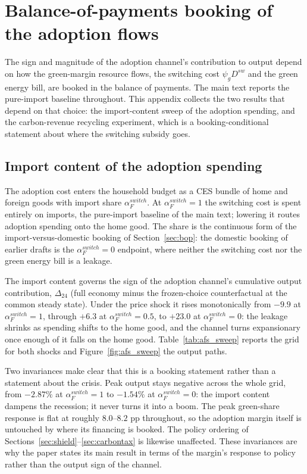 \section{Balance-of-payments booking of the adoption flows}
\label{app:booking}

The sign and magnitude of the adoption channel's contribution to output depend
on how the green-margin resource flows, the switching cost $\psi_g D^{sw}$ and
the green energy bill, are booked in the balance of payments. The main text
reports the pure-import baseline throughout. This appendix collects the two
results that depend on that choice: the import-content sweep of the adoption
spending, and the carbon-revenue recycling experiment, which is a
booking-conditional statement about where the switching subsidy goes.

\subsection{Import content of the adoption spending}\label{app:booking_flows}
The adoption cost enters the household budget as a CES bundle of home and
foreign goods with import share $\alpha_F^{switch}$. At $\alpha_F^{switch}=1$ the
switching cost is spent entirely on imports, the pure-import baseline of the main
text; lowering it routes adoption spending onto the home good. The share is the
continuous form of the import-versus-domestic booking of
Section~\ref{sec:bop}: the domestic booking of earlier drafts is the
$\alpha_F^{switch}=0$ endpoint, where neither the switching cost nor the green
energy bill is a leakage.

The import content governs the sign of the adoption channel's cumulative output
contribution, $\Delta_{24}$ (full economy minus the frozen-choice counterfactual
at the common steady state). Under the price shock it rises monotonically from
$-9.9$ at $\alpha_F^{switch}=1$, through $+6.3$ at $\alpha_F^{switch}=0.5$, to
$+23.0$ at $\alpha_F^{switch}=0$: the leakage shrinks as spending shifts to the
home good, and the channel turns expansionary once enough of it falls on the home
good. Table~\ref{tab:afs_sweep} reports the grid for both shocks and
Figure~\ref{fig:afs_sweep} the output paths.

Two invariances make clear that this is a booking statement rather than a statement
about the crisis. Peak output stays negative across the whole grid, from
$-2.87\%$ at $\alpha_F^{switch}=1$ to $-1.54\%$ at $\alpha_F^{switch}=0$: the
import content dampens the recession; it never turns it into a boom. The peak
green-share response is flat at roughly $8.0$--$8.2$ pp throughout, so the
adoption margin itself is untouched by where its financing is booked. The policy
ordering of Sections~\ref{sec:shield}--\ref{sec:carbontax} is likewise
unaffected. These invariances are why the paper states its main result in terms of the
margin's response to policy rather than the output sign of the channel.

